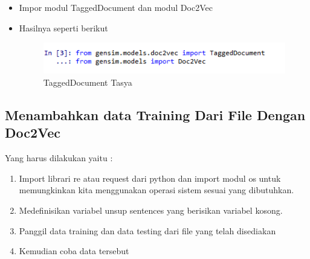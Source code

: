 \begin{itemize}
\item Impor modul TaggedDocument dan modul Doc2Vec
\item Hasilnya seperti berikut
\begin{figure}[ht]
\centering
\includegraphics[scale=0.5]{figures/chapter5tasya18.png}
\caption{TaggedDocument Tasya }
\label{Praktek}
\end{figure}
\end{itemize}


\subsection{Menambahkan data Training Dari File Dengan Doc2Vec}
Yang harus dilakukan yaitu :
\begin{enumerate}
\item Import librari re atau request dari python dan import modul os untuk memungkinkan kita menggunakan operasi sistem sesuai yang dibutuhkan.
\item Medefinisikan variabel unsup sentences yang berisikan variabel kosong.
\item Panggil data training dan data testing dari file yang telah disediakan
\item Kemudian coba data tersebut
\end{enumerate}

